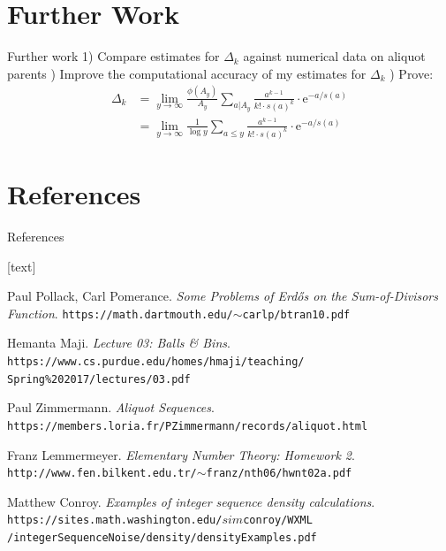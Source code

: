 \documentclass{beamer}
\begin{document}
\section{Further Work}
\begin{frame}{Further work}
1) Compare estimates for $\Delta_k$ against numerical data on aliquot parents  ) Improve the computational accuracy of my estimates for $\Delta_k$  ) Prove: \begin{align*}
       \Delta_k &= \lim_{y \to \infty} \frac{\phi(A_y)}{A_y} \sum_{a|A_{y}} \frac{a^{k-1}}{k! \cdot s(a)^k} \cdot \text{e}^{-a/s(a)}\\
       &= \lim_{y \to \infty} \frac{1}{\log y}\sum_{a \leq y} \frac{a^{k-1}}{k! \cdot s(a)^k} \cdot \text{e}^{-a/s(a)}
   \end{align*}

\end{frame}

\section{References}
\begin{frame}{References}
    \begin{thebibliography}{9}
[text]

Paul Pollack, Carl Pomerance.
\textit{Some Problems of Erdős on the Sum-of-Divisors Function}. 
\texttt{https://math.dartmouth.edu/$\sim$carlp/btran10.pdf}

Hemanta Maji. 
\textit{Lecture 03: Balls \& Bins}.
\texttt{https://www.cs.purdue.edu/homes/hmaji/teaching/\\Spring\%202017/lectures/03.pdf}

Paul Zimmermann.
\textit{Aliquot Sequences}.
\\\texttt{https://members.loria.fr/PZimmermann/records/aliquot.html}

Franz Lemmermeyer.
\textit{Elementary Number Theory: Homework 2}.
\\\texttt{http://www.fen.bilkent.edu.tr/$\sim$franz/nth06/hwnt02a.pdf}

Matthew Conroy.
\textit{Examples of integer sequence density calculations}.
\\\texttt{https://sites.math.washington.edu/$sim$conroy/WXML\\/integerSequenceNoise/density/densityExamples.pdf}


\end{thebibliography}
\end{frame}
\end{document}
